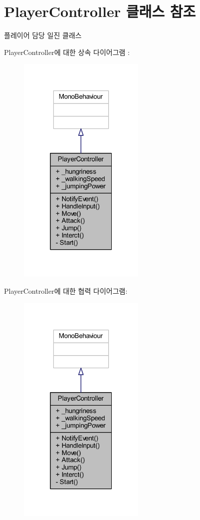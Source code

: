 \hypertarget{class_player_controller}{}\section{Player\+Controller 클래스 참조}
\label{class_player_controller}


플레이어 담당 일진 클래스  




Player\+Controller에 대한 상속 다이어그램 \+: \nopagebreak
\begin{figure}[H]
\begin{center}
\leavevmode
\includegraphics[width=172pt]{d1/dc2/class_player_controller__inherit__graph}
\end{center}
\end{figure}


Player\+Controller에 대한 협력 다이어그램\+:\nopagebreak
\begin{figure}[H]
\begin{center}
\leavevmode
\includegraphics[width=172pt]{db/de2/class_player_controller__coll__graph}
\end{center}
\end{figure}
